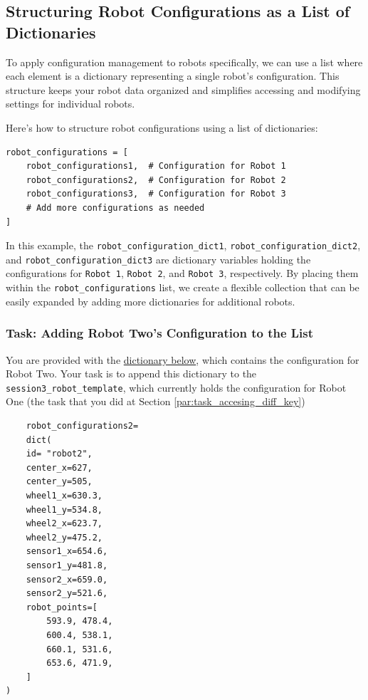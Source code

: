 \subsection{Structuring Robot Configurations as a List of Dictionaries}
To apply configuration management to robots specifically, we can use a list where each element is a dictionary representing a single robot's configuration. This structure keeps your robot data organized and simplifies accessing and modifying settings for individual robots.

Here's how to structure robot configurations using a list of dictionaries:

\begin{verbatim}
robot_configurations = [
    robot_configurations1,  # Configuration for Robot 1
    robot_configurations2,  # Configuration for Robot 2
    robot_configurations3,  # Configuration for Robot 3
    # Add more configurations as needed
]
\end{verbatim}

In this example, the \texttt{robot\_configuration\_dict1}, \texttt{robot\_configuration\_dict2}, and \texttt{robot\_configuration\_dict3} are dictionary variables holding the configurations for \texttt{Robot 1}, \texttt{Robot 2}, and \texttt{Robot 3}, respectively. By placing them within the \texttt{robot\_configurations} list, we create a flexible collection that can be easily expanded by adding more dictionaries for additional robots.

\subsubsection{Task: Adding Robot Two's Configuration to the List}

You are provided with the \href{https://github.com/balandongiv/computer_programming_gist/blob/main/session3/robot2_configuration.py}{dictionary below}, which contains the configuration for Robot Two. Your task is to append this dictionary to the \texttt{session3\_robot\_template}, which currently holds the configuration for Robot One (the task that you did at Section \ref{par:task_accesing_diff_key})

\begin{verbatim}
    robot_configurations2=
    dict(
    id= "robot2",
    center_x=627,
    center_y=505,
    wheel1_x=630.3,
    wheel1_y=534.8,
    wheel2_x=623.7,
    wheel2_y=475.2,
    sensor1_x=654.6,
    sensor1_y=481.8,
    sensor2_x=659.0,
    sensor2_y=521.6,
    robot_points=[
        593.9, 478.4,
        600.4, 538.1,
        660.1, 531.6,
        653.6, 471.9,
    ]
)
\end{verbatim}

